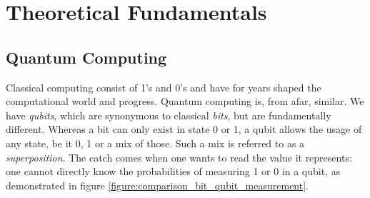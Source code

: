 \chapter{Theoretical Fundamentals} %

\label{chapter:theoretical_fundamentals} %

\def \blochwidth {0.4}
\def \qspherewidth {0.5}
\def \histogramwidth {0.4}
\newcommand{\bloch}{\emph{Bloch}-Sphere}
\newcommand{\qsphere}{Q-Sphere}
\newcommand{\hgate}{$\mathrm{H}$-Gate}

\newcommand{\xgate}{$\mathrm{X}$-Gate}
\newcommand{\ygate}{$\mathrm{Y}$-Gate}
\newcommand{\zgate}{$\mathrm{Z}$-Gate}

\newcommand{\rygate}{$\mathrm{RY}$-Gate}
\newcommand{\rxgate}{$\mathrm{RX}$-Gate}
\newcommand{\rzgate}{$\mathrm{RZ}$-Gate}

\newcommand{\crygate}{$\mathrm{CRY}$-Gate}
\newcommand{\crxgate}{$\mathrm{CRX}$-Gate}
\newcommand{\crzgate}{$\mathrm{CRZ}$-Gate}

\newcommand{\cxgate}{$\mathrm{CX}$-Gate}
\newcommand{\cygate}{$\mathrm{CY}$-Gate}
\newcommand{\czgate}{$\mathrm{CZ}$-Gate}

\newcommand{\frenchquotes}[1]{«~#1~»}

\section{Quantum Computing}
Classical computing consist of 1's and 0's and have for years shaped the computational world and progress. Quantum computing is, from afar, similar. We have \emph{qubits}, which are synonymous to classical \emph{bits}, but are fundamentally different. Whereas a bit can only exist in state 0 or 1, a qubit allows the usage of any state, be it 0, 1 or a mix of those. Such a mix is referred to as a \emph{superposition}\cite{gudder_superposition_1970}. The catch comes when one wants to read the value it represents: one cannot directly know the probabilities of measuring 1 or 0 in a qubit, as demonstrated in figure \ref{figure:comparison_bit_qubit_measurement}.

